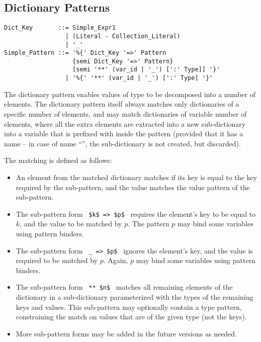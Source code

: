 \subsection{Dictionary Patterns}
\label{sec:dict-patterns}

\syntax\begin{lstlisting}
Dict_Key       ::= Simple_Expr1
                 | (Literal - Collection_Literal)
                 | '_'
Simple_Pattern ::= '%{' Dict_Key '=>' Pattern 
                   {semi Dict_Key '=>' Pattern}
                   [semi '**' (var_id | '_') [':' Type]] '}'
                 | '%{' '**' (var_id | '_') [':' Type] '}'
\end{lstlisting}

The dictionary pattern enables values of  type to be decomposed into a number of elements. The dictionary pattern itself always matches only dictionaries of a specific number of elements, and may match dictionaries of variable number of elements, where all the extra elements are extracted into a new sub-dictionary into a variable that is prefixed with \code{**} inside the pattern (provided that it has a name -- in case of name ``\code{_}'', the sub-dictionary is not created, but discarded). 

The matching is defined as follows: 
\begin{itemize}
  \item An element from the matched dictionary matches if its key is equal to the key required by the sub-pattern, and the value matches the value pattern of the sub-pattern. 
  \item The sub-pattern form ~\lstinline!$k$ => $p$!~ requires the element's key to be equal to $k$, and the value to be matched by $p$. The pattern $p$ may bind some variables using pattern binders. 
  \item The sub-pattern form ~\lstinline!_ => $p$!~ ignores the element's key, and the value is required to be matched by $p$. Again, $p$ may bind some variables using pattern binders. 
  \item The sub-pattern form ~\lstinline!** $n$!~ matches all remaining elements of the dictionary in a sub-dictionary parameterized with the types of the remaining keys and values. This sub-pattern may optionally contain a type pattern, constraining the match on values that are of the given type (not the keys). 
  \item More sub-pattern forms may be added in the future versions as needed. %
\end{itemize}

